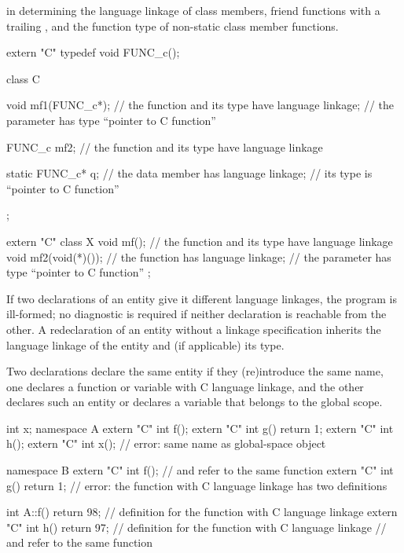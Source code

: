 in determining the language linkage of
class members,
friend functions with a trailing , and the
function type of non-static class member functions.
\begin{example}
\begin{codeblock}
extern "C" typedef void FUNC_c();

class C {
  void mf1(FUNC_c*);            // the function  and its type have \Cpp{} language linkage;
                                // the parameter has type ``pointer to C function''

  FUNC_c mf2;                   // the function  and its type have \Cpp{} language linkage

  static FUNC_c* q;             // the data member  has \Cpp{} language linkage;
                                // its type is ``pointer to C function''
};

extern "C" {
  class X {
    void mf();                  // the function  and its type have \Cpp{} language linkage
    void mf2(void(*)());        // the function  has \Cpp{} language linkage;
                                // the parameter has type ``pointer to C function''
  };
}
\end{codeblock}
\end{example}

\pnum
If two declarations of an entity give it different language linkages, the
program is ill-formed; no diagnostic is required if neither declaration
is reachable from the other.
%
A redeclaration of an entity without a linkage specification
inherits the language linkage of the entity and (if applicable) its type.

\pnum
{}%
Two declarations declare the same entity
if they (re)introduce the same name,
one declares a function or variable with C language linkage,
and the other declares such an entity or declares a variable
that belongs to the global scope.
\begin{example}
\begin{codeblock}
int x;
namespace A {
  extern "C" int f();
  extern "C" int g() { return 1; }
  extern "C" int h();
  extern "C" int x();               // error: same name as global-space object 
}

namespace B {
  extern "C" int f();               //  and  refer to the same function
  extern "C" int g() { return 1; }  // error: the function  with C language linkage has two definitions
}

int A::f() { return 98; }           // definition for the function  with C language linkage
extern "C" int h() { return 97; }   // definition for the function  with C language linkage
                                    //  and  refer to the same function
\end{codeblock}
\end{example}


